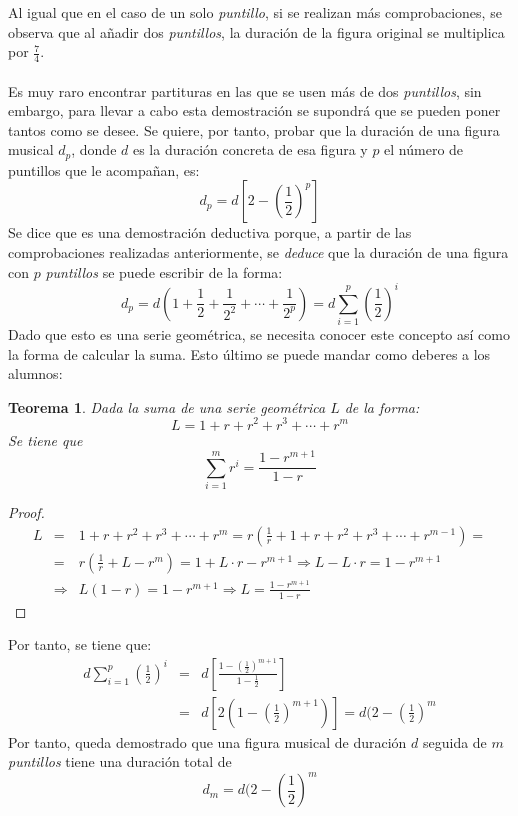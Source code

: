\documentclass[a4paper, openright, 11pt, titlepage]{report}
\newtheorem{teor}[propo]{Teorema}
\theoremstyle{definition}\newtheorem{defin}[propo]{Definition}
\theoremstyle{definition}\newtheorem{obser}[propo]{Remark}
\theoremstyle{definition}\newtheorem{ejem}[propo]{Ejemplo}
\theoremstyle{definition}\newtheorem{algoritmo}[propo]{Algoritmo}
\begin{document}
\begin{itemize}
    Al igual que en el caso de un solo \textit{puntillo}, si se realizan más comprobaciones, se observa que al añadir dos \textit{puntillos}, la duración de la figura original se multiplica por $\frac{7}{4}$.\\\\
    Es muy raro encontrar partituras en las que se usen más de dos \textit{puntillos}, sin embargo, para llevar a cabo esta demostración se supondrá que se pueden poner tantos como se desee. Se quiere, por tanto, probar que la duración de una figura musical $d_{p}$, donde $d$ es la duración concreta de esa figura y $p$ el número de puntillos que le acompañan, es: $$d_{p} = d[2-(\frac{1}{2})^{p}]$$
    Se dice que es una demostración deductiva porque, a partir de las comprobaciones realizadas anteriormente, se \textit{deduce} que la duración de una figura con $p$ \textit{puntillos} se puede escribir de la forma: $$d_{p} = d(1 + \frac{1}{2} + \frac{1}{2^{2}} + \cdots + \frac{1}{2^{p}}) = d\sum_{i=1}^{p}(\frac{1}{2})^{i}$$
    Dado que esto es una serie geométrica, se necesita conocer este concepto así como la forma de calcular la suma. Esto último se puede mandar como deberes a los alumnos:
    \begin{teor}
    Dada la suma de una serie geométrica $L$ de la forma: 
    $$L = 1 + r + r^{2} + r^{3} + \cdots + r^{m}$$
    Se tiene que
    $$\sum_{i=1}^{m}r^{i} = \frac{1-r^{m+1}}{1-r}$$
    \end{teor}
    \begin{proof}
    \begin{eqnarray*}
    L & = & 1 + r + r^{2} + r^{3} + \cdots + r^{m} = r(\frac{1}{r} + 1 + r + r^{2} + r^{3} + \cdots + r^{m-1}) = \\
    & = & r(\frac{1}{r} + L - r^{m}) = 1 + L\cdot r - r^{m+1}  \Longrightarrow L - L\cdot r = 1 - r^{m+1} \\
    & \Longrightarrow & L(1-r) = 1-r^{m+1} \Longrightarrow \boxed{L = \frac{1-r^{m+1}}{1-r}}
    \end{eqnarray*}
    \end{proof}
    Por tanto, se tiene que:
    \begin{eqnarray*}
    d\sum_{i=1}^{p}(\frac{1}{2})^{i} & = & d[\frac{1-(\frac{1}{2})^{m+1}}{1-\frac{1}{2}}] \\
    & = & d[2(1-(\frac{1}{2})^{m+1})] = \boxed{d(2-(\frac{1}{2})^{m}}
    \end{eqnarray*}
    Por tanto, queda demostrado que una figura musical de duración $d$ seguida de $m$ \textit{puntillos} tiene una duración total de $$d_{m} = d(2-(\frac{1}{2})^{m}$$

\end{itemize}
\end{document}
